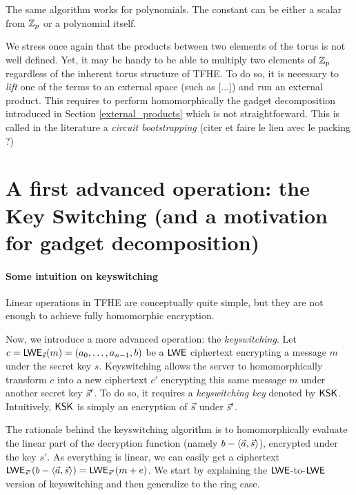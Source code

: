 The same algorithm works for polynomials. The constant can be either a scalar from $\mathbb{Z}_p$ or a polynomial itself.




We stress once again that the products between two elements of the torus is not well defined. Yet, it may be handy to be able to multiply two elements of $\mathbb{Z}_p$ regardless of the inherent torus structure of TFHE. To do so, it is necessary to \textit{lift} one of the terms to an external space (such as [...]) and run an external product. This requires to perform homomorphically the gadget decomposition introduced in Section \ref{external_products} which is not straightforward. This is called in the literature a \textit{circuit bootstrapping} (citer et faire le lien avec le packing ?)



\section{A first advanced operation: the Key Switching (and a motivation for gadget decomposition)}




\paragraph{Some intuition on keyswitching}
Linear operations in TFHE are conceptually quite simple, but they are not enough to achieve fully homomorphic encryption.

Now, we introduce a more advanced operation: the \textit{keyswitching}. Let $c = \textsf{LWE}_{\vec s}(m) = (a_0, \dots, a_{n-1}, b)$ be a $\textsf{LWE}$ ciphertext encrypting a message $m$ under the secret key $s$. Keyswitching allows the server to homomorphically transform $c$ into a new ciphertext $c'$ encrypting this same message $m$ under another secret key $\vec s'$. To do so, it requires a \textit{keyswitching key} denoted by $\textsf{KSK}$. Intuitively, $\textsf{KSK}$ is simply an encryption of $\vec s$ under $\vec s'$. 

The rationale behind the keyswitching algorithm is to homomorphically evaluate the linear part of the decryption function (namely $b - \langle \vec a, \vec s \rangle$), encrypted under the key $s'$. As everything is linear, we can easily get a ciphertext $\textsf{LWE}_{\vec s'}(b - \langle \vec a, \vec s \rangle) = \textsf{LWE}_{\vec s'}(m + e)$. We start by explaining the $\textsf{LWE}$-to-$\textsf{LWE}$ version of keyswitching and then generalize to the ring case.

